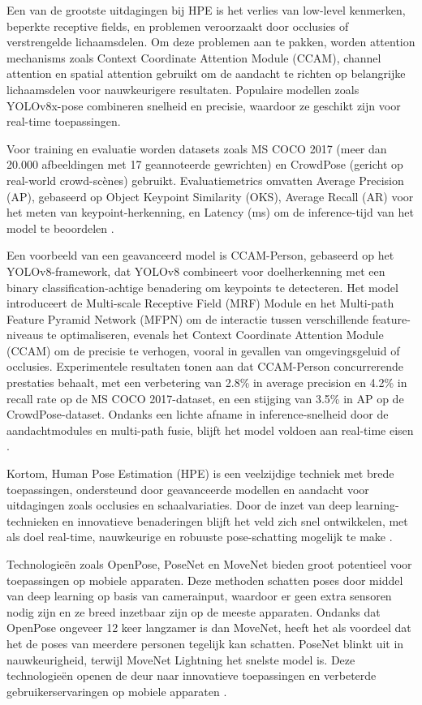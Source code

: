 Een van de grootste uitdagingen bij HPE is het verlies van low-level kenmerken, beperkte receptive fields, en problemen veroorzaakt door occlusies of verstrengelde lichaamsdelen. 
Om deze problemen aan te pakken, worden attention mechanisms zoals Context Coordinate Attention Module (CCAM), channel attention en spatial attention gebruikt om de aandacht te richten op belangrijke lichaamsdelen voor nauwkeurigere resultaten. 
Populaire modellen zoals YOLOv8x-pose combineren snelheid en precisie, waardoor ze geschikt zijn voor real-time toepassingen.

Voor training en evaluatie worden datasets zoals MS COCO 2017 (meer dan 20.000 afbeeldingen met 17 geannoteerde gewrichten) en CrowdPose (gericht op real-world crowd-scènes) gebruikt. 
Evaluatiemetrics omvatten Average Precision (AP), gebaseerd op Object Keypoint Similarity (OKS), Average Recall (AR) voor het meten van keypoint-herkenning, en Latency (ms) om de inference-tijd van het model te beoordelen \autocite{DongEtAl2024}.

Een voorbeeld van een geavanceerd model is CCAM-Person, gebaseerd op het YOLOv8-framework, dat YOLOv8 combineert voor doelherkenning met een binary classification-achtige benadering om keypoints te detecteren. Het model introduceert de Multi-scale Receptive Field (MRF) Module en het Multi-path Feature Pyramid Network (MFPN) om de interactie tussen verschillende feature-niveaus te optimaliseren, evenals het Context Coordinate Attention Module (CCAM) om de precisie te verhogen, vooral in gevallen van omgevingsgeluid of occlusies. 
Experimentele resultaten tonen aan dat CCAM-Person concurrerende prestaties behaalt, met een verbetering van 2.8\% in average precision en 4.2\% in recall rate op de MS COCO 2017-dataset, en een stijging van 3.5\% in AP op de CrowdPose-dataset. 
Ondanks een lichte afname in inference-snelheid door de aandachtmodules en multi-path fusie, blijft het model voldoen aan real-time eisen \autocite{DongEtAl2024}.

Kortom, Human Pose Estimation (HPE) is een veelzijdige techniek met brede toepassingen, ondersteund door geavanceerde modellen en aandacht voor uitdagingen zoals occlusies en schaalvariaties. 
Door de inzet van deep learning-technieken en innovatieve benaderingen blijft het veld zich snel ontwikkelen, met als doel real-time, nauwkeurige en robuuste pose-schatting mogelijk te make \autocite{DongEtAl2024}.


Technologieën zoals OpenPose, PoseNet en MoveNet bieden groot potentieel voor toepassingen op mobiele apparaten. 
Deze methoden schatten poses door middel van deep learning op basis van camerainput, waardoor er geen extra sensoren nodig zijn en ze breed inzetbaar zijn op de meeste apparaten. 
Ondanks dat OpenPose ongeveer 12 keer langzamer is dan MoveNet, heeft het als voordeel dat het de poses van meerdere personen tegelijk kan schatten. PoseNet blinkt uit in nauwkeurigheid, terwijl MoveNet Lightning het snelste model is.
Deze technologieën openen de deur naar innovatieve toepassingen en verbeterde gebruikerservaringen op mobiele apparaten \autocite{BeomjunEtAl2022}.

